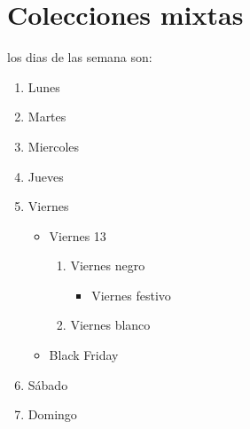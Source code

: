 \documentclass[10pt,a4paper]{article}
\begin{document}
\section{Colecciones mixtas}
		los dias de las semana son: 
	\begin{enumerate}
		\item Lunes
		\item Martes
		\item Miercoles
		\item Jueves 
		\item Viernes
			\begin{itemize}
				\item Viernes 13
					\begin{enumerate}
						\item Viernes negro
							\begin{itemize}
								\item Viernes festivo 
							\end{itemize}
						\item Viernes blanco 
					\end{enumerate}
				\item Black Friday
			\end{itemize}		 
		\item Sábado 
		\item Domingo
	\end{enumerate}
\end{document}
